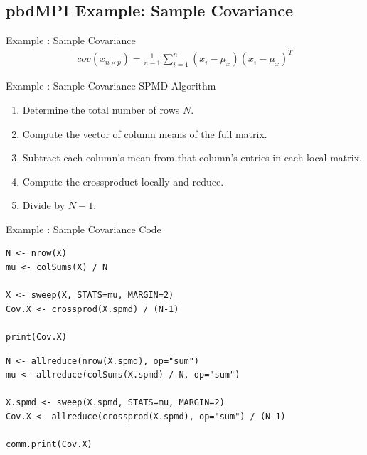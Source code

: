 \subsection{pbdMPI Example: Sample Covariance}

\begin{frame}
  \begin{block}{Example \countex :  Sample Covariance}\pause
  \begin{align*}
    cov(x_{n\times p}) = \frac{1}{n-1}\sum_{i=1}^n\left(x_i-\mu_x\right)\left(x_i-\mu_x\right)^T
  \end{align*}
  \end{block}
\end{frame}


\begin{frame}
  \begin{block}{Example \showex :  Sample Covariance SPMD Algorithm}\pause
    \begin{enumerate}
     \item Determine the total number of rows $N$.
     \item Compute the vector of column means of the full matrix.
     \item Subtract each column's mean from that column's entries in each local matrix.
     \item Compute the crossproduct locally and reduce.
     \item Divide by $N-1$.
    \end{enumerate}
  \end{block}
\end{frame}


\begin{frame}
  \begin{exampleblock}{Example \showex :  Sample Covariance Code}\pause
\begin{lstlisting}[title=Serial Code]
N <- nrow(X)
mu <- colSums(X) / N

X <- sweep(X, STATS=mu, MARGIN=2)
Cov.X <- crossprod(X.spmd) / (N-1)

print(Cov.X)
\end{lstlisting}
  
\begin{lstlisting}[title=Parallel Code]
N <- allreduce(nrow(X.spmd), op="sum")
mu <- allreduce(colSums(X.spmd) / N, op="sum")

X.spmd <- sweep(X.spmd, STATS=mu, MARGIN=2)
Cov.X <- allreduce(crossprod(X.spmd), op="sum") / (N-1)

comm.print(Cov.X)
\end{lstlisting}
  \end{exampleblock}
\end{frame}







